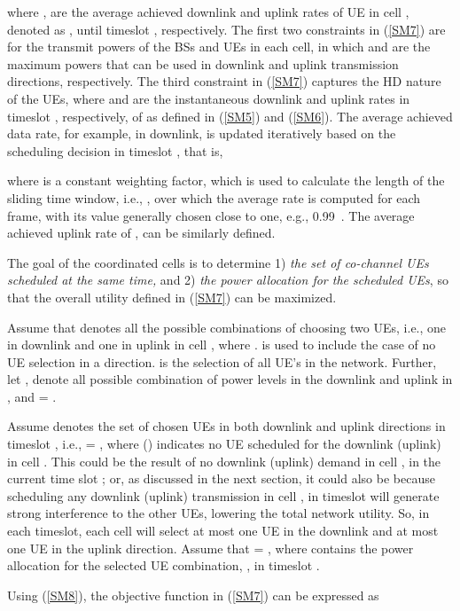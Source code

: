 \documentclass[journal]{IEEEtran}
\begin{document}
where ,  are the average achieved downlink and uplink rates of UE  in cell , denoted as , until timeslot , respectively. The first two constraints in (\ref{SM7}) are for the transmit powers of the BSs and UEs in each cell, in which  and  are the maximum powers that can be used in downlink and uplink transmission directions, respectively. The third constraint in (\ref{SM7}) captures the HD nature of the UEs, where  and  are the instantaneous downlink and uplink rates in timeslot , respectively, of  as defined in (\ref{SM5}) and (\ref{SM6}). The average achieved data rate, for example, in downlink,  is updated iteratively based on the scheduling decision in timeslot , that is, 

where  is a constant weighting factor, which is used to calculate the length of the sliding time window, i.e., , over which the average rate is computed for each frame, with its value generally chosen close to one, e.g., 0.99~\cite{Stoylar05, jalali2000data}. The average achieved uplink rate of ,  can be similarly defined.

The goal of the coordinated cells is to determine 1) \textit{the set of co-channel UEs scheduled at the same time,} and 2) \textit{the power allocation for the scheduled UEs}, so that the overall utility defined in (\ref{SM7}) can be maximized. 

Assume that  denotes all the possible combinations of choosing two UEs, i.e., one in downlink and one in uplink in cell , where .  is used to include the case of no UE selection in a direction.  is the selection of all UE's in the network. Further, let , denote all possible combination of power levels in the downlink and uplink in , and  =  .

Assume  denotes the set of chosen UEs in both downlink and uplink directions in timeslot , i.e.,  = , where  () indicates no UE scheduled for the downlink (uplink) in cell . This could be the result of no downlink (uplink) demand in cell , in the current time slot ; or, as discussed in the next section, it could also be because scheduling any downlink (uplink) transmission in cell , in timeslot  will generate strong interference to the other UEs, lowering the total network utility. So, in each timeslot, each cell will select at most one UE in the downlink and at most one UE in the uplink direction. Assume that  = , where  contains the power allocation for the selected UE combination, , in timeslot . 

Using (\ref{SM8}), the objective function in (\ref{SM7}) can be expressed as
\end{document}
